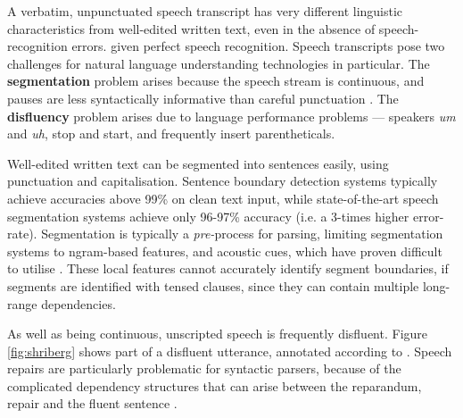 \documentclass[11pt,letterpaper]{article}
\begin{document}
A verbatim, unpunctuated speech transcript has very different linguistic characteristics
from well-edited written text, even in the absence of speech-recognition errors.
given perfect speech recognition.  Speech transcripts pose
two challenges for natural language understanding technologies in particular.
The \textbf{segmentation} problem arises because the speech stream is continuous,
and  pauses are less syntactically informative than careful punctuation \citep{gregory:04}.
The \textbf{disfluency} problem arises due to language performance problems ---
speakers \emph{um} and \emph{uh}, stop and start, and frequently insert parentheticals.


Well-edited written text can be segmented into sentences easily, using punctuation and
capitalisation.  Sentence boundary detection systems typically achieve accuracies
above 99\% on clean text input, while state-of-the-art speech segmentation systems
achieve only 96-97\% accuracy (i.e. a 3-times higher error-rate).
Segmentation is typically a \emph{pre-}process for parsing, limiting segmentation
systems to ngram-based features, and acoustic cues, which have proven difficult
to utilise \citep{liu:05}.  These local features cannot accurately identify
segment boundaries, if segments are identified with tensed clauses, since they can
contain multiple long-range dependencies.

As well as being continuous, unscripted speech is frequently disfluent.
Figure \ref{fig:shriberg} shows part of a disfluent utterance, annotated according to
\citet{shriberg:94}.
Speech repairs are particularly problematic for syntactic
parsers, because of the complicated dependency structures that can arise between the
reparandum, repair and the fluent sentence \citep{Johnson04a}.
\end{document}

